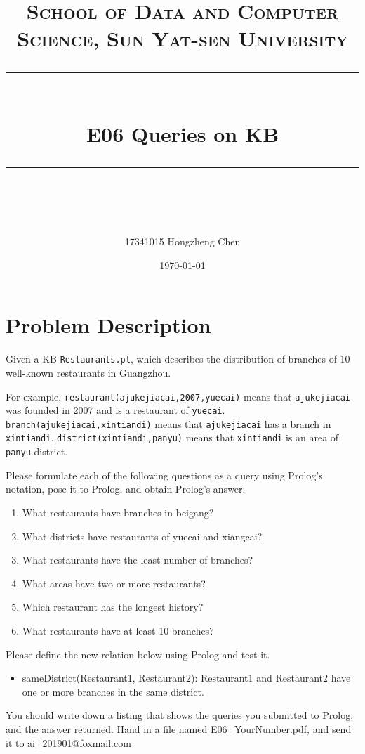 ﻿\documentclass[a4paper, 11pt]{article}
\title{
\normalfont \normalsize
\textsc{School of Data and Computer Science, Sun Yat-sen University} \\ [25pt] %
\rule{\textwidth}{0.5pt} \\[0.4cm] %
\huge  E06 Queries on KB \\ %
\rule{\textwidth}{2pt} \\[0.5cm] %
\author{17341015 Hongzheng Chen}
\date{\normalsize\today}
}
\begin{document}
\maketitle
\tableofcontents
\newpage


\section{Problem Description}
Given a KB \texttt{Restaurants.pl}, which describes the distribution of branches of 10 well-known restaurants in Guangzhou.

For example, \texttt{restaurant(ajukejiacai,2007,yuecai)} means that \texttt{ajukejiacai} was founded in 2007 and is a restaurant of \texttt{yuecai}. \texttt{branch(ajukejiacai,xintiandi)} means that \texttt{ajukejiacai} has a branch in \texttt{xintiandi}. \texttt{district(xintiandi,panyu)} means that \texttt{xintiandi} is an area of \texttt{panyu} district.

Please formulate each of the following questions as a query using Prolog's notation, pose it to Prolog, and obtain Prolog's answer:
\begin{enumerate}
  \item What restaurants have branches in beigang?
  \item What districts have restaurants of yuecai and xiangcai?
  \item What restaurants have the least number of branches?
  \item What areas have two or more restaurants?
\item Which restaurant has the longest history?
\item What restaurants have at least 10 branches?
\end{enumerate}
Please define the new relation below using Prolog and test it.
\begin{itemize}
\item sameDistrict(Restaurant1, Restaurant2): Restaurant1 and Restaurant2 have one or more branches in the same district.
\end{itemize}

You should write down a listing that shows the queries you submitted to Prolog, and the answer returned. Hand in a file named \textsf{E06\_YourNumber.pdf}, and send it to \textsf{ai\_201901@foxmail.com}
\end{document}
